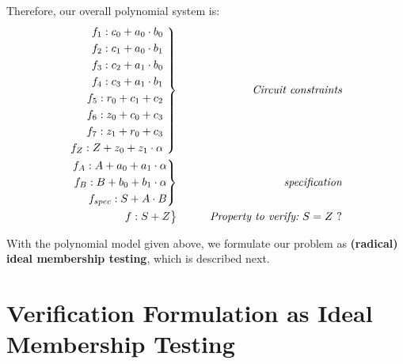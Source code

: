 \begin{Example}
Therefore, our overall polynomial system is:
\begin{eqnarray}
 \left .  \begin{aligned}
f_1: c_0+a_0 \cdot b_0  \\
f_2: c_1+a_0 \cdot b_1  \\
f_3: c_2+a_1 \cdot b_0  \\
f_4: c_3+a_1 \cdot b_1  \\
f_5: r_0+c_1 + c_2		\\
f_6: z_0+c_0 + c_3		\\
f_7: z_1+r_0 + c_3		\\
f_{Z}: Z+z_0+z_1\cdot \alpha   
 \end{aligned} 
\ \right\}
 &\qquad&  {\text {\it Circuit constraints}} \nonumber \\
 \left . \begin{aligned}
f_{A}: A+a_0+a_1\cdot \alpha  \\ 
f_{B}: B+b_0+b_1\cdot  \alpha  \\ 
f_{spec}: S+A\cdot B   
 \end{aligned} 
\right\}
 &\qquad&  {\text {\it specification}} \nonumber \\
 \left .  \begin{aligned}
f: S+Z  \nonumber 
 \end{aligned} 
\right\}
 &\qquad& \text{\it Property to verify:} ~S = Z~? 
\end{eqnarray}

\end{Example}


With the polynomial model given above, we formulate our problem as 
{\bf (radical) ideal membership testing},  which is described next.


\section{Verification Formulation as Ideal Membership Testing}\label{sec:radicaltest}


